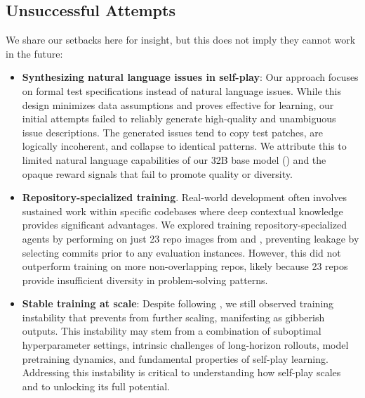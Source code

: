 \subsection{Unsuccessful Attempts}
We share our setbacks here for insight, but this does not imply they cannot work in the future:
\begin{itemize}
\item \textbf{Synthesizing natural language issues in self-play}: Our approach focuses on formal test specifications instead of natural language issues. While this design minimizes data assumptions and proves effective for learning, our initial attempts failed to reliably generate high-quality and unambiguous issue descriptions. The generated issues tend to copy test patches, are logically incoherent, and collapse to identical patterns. We attribute this to limited natural language capabilities of our 32B base model (\cwm) and the opaque reward signals that fail to promote quality or diversity.
\item{\bfseries Repository-specialized training}. Real-world development often involves sustained work within specific codebases where deep contextual knowledge provides significant advantages.
We explored training repository-specialized agents by performing \tech on just 23 repo images from \sbv and \sbp, preventing leakage by selecting commits prior to any evaluation instances. However, this did not outperform training on more non-overlapping repos, likely because 23 repos provide insufficient diversity in problem-solving patterns.
\item \textbf{Stable training at scale}: Despite following \cite{khatri2025artscalingreinforcementlearning,qwenstablerl}, we still observed training instability that prevents \tech from further scaling, manifesting as gibberish outputs.
This instability may stem from a combination of suboptimal hyperparameter settings, intrinsic challenges of long-horizon rollouts, model pretraining dynamics, and fundamental properties of self-play learning.
Addressing this instability is critical to understanding how self-play scales and to unlocking its full potential.
\end{itemize}

